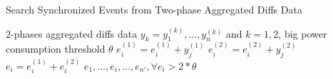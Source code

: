 \begin{algorithm}
\caption{Search Synchronized Events from Two-phase Aggregated Diffs Data}
\label{alg_synchronizeEvents}
\begin{algorithmic}[1]
\REQUIRE $2$-phases aggregated diffs data $y_k=y_1^{(k)}, ..., y_n^{(k)}$ and $k=1,2$, %
big power consumption threshold $\theta$
\STATE $e_i^{(1)}= e_i^{(1)} + y_j^{(1)}$
\STATE $e_i^{(2)}= e_i^{(2)} + y_j^{(2)}$
\ENDIF
\ENDFOR
\STATE $e_i = e_i^{(1)} +e_i^{(2)}$
\ENDIF
\ENDFOR
\RETURN $e_1, ..., e_i, ..., e_{n'}, \forall e_i > 2*\theta$
\end{algorithmic}
\end{algorithm}